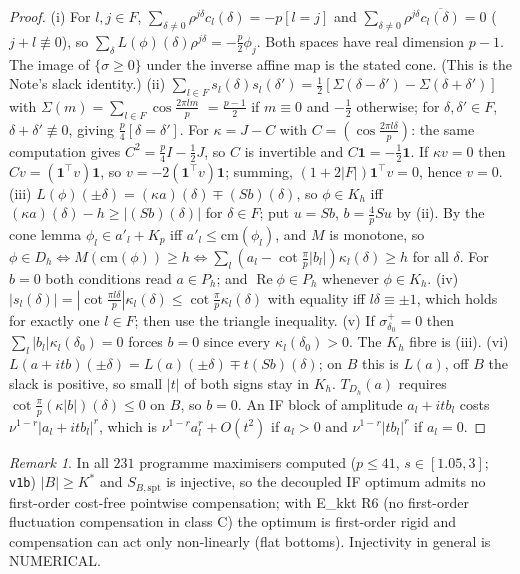 \documentclass[11pt]{article}
\theoremstyle{remark}
\newtheorem{remark}[theorem]{Remark}
\newcommand{\Re}{\operatorname{Re}}
\renewcommand{\Re}{\operatorname{Re}}
\begin{document}
\begin{proof}
(i) For $l,j\in F$, $\sum_{\delta\ne0}\rho^{j\delta}c_l(\delta)=-p[l=j]$ and $\sum_{\delta\ne0}\rho^{j\delta}\overline{c_l(\delta)}=0$
($j+l\not\equiv0$), so $\sum_\delta L(\phi)(\delta)\rho^{j\delta}=-\frac p2\phi_j$.  Both spaces have real dimension $p-1$.
The image of $\{\sigma\ge0\}$ under the inverse affine map is the stated cone.  (This is the Note's slack identity.)
(ii) $\sum_{l\in F}s_l(\delta)s_l(\delta')=\frac12[\Sigma(\delta-\delta')-\Sigma(\delta+\delta')]$ with $\Sigma(m)=\sum_{l\in F}\cos\frac{2\pi lm}p$
$=\frac{p-1}2$ if $m\equiv0$ and $-\frac12$ otherwise; for $\delta,\delta'\in F$, $\delta+\delta'\not\equiv0$, giving $\frac p4[\delta=\delta']$.
For $\kappa=J-C$ with $C=(\cos\frac{2\pi l\delta}p)$: the same computation gives $C^2=\frac p4I-\frac12J$, so $C$ is invertible and
$C\mathbf 1=-\frac12\mathbf 1$.  If $\kappa v=0$ then $Cv=(\mathbf 1^\top v)\mathbf 1$, so $v=-2(\mathbf 1^\top v)\mathbf 1$; summing,
$(1+2|F|)\mathbf 1^\top v=0$, hence $v=0$.
(iii) $L(\phi)(\pm\delta)=(\kappa a)(\delta)\mp(Sb)(\delta)$, so $\phi\in K_h$ iff $(\kappa a)(\delta)-h\ge|(Sb)(\delta)|$ for $\delta\in F$; put $u=Sb$,
$b=\frac4pSu$ by (ii).  By the cone lemma $\phi_l\in a'_l+K_p$ iff $a'_l\le\mathrm{cm}(\phi_l)$, and $M$ is monotone, so
$\phi\in D_h\iff M(\mathrm{cm}(\phi))\ge h\iff\sum_l(a_l-\cot\frac\pi p|b_l|)\kappa_l(\delta)\ge h$ for all $\delta$.  For $b=0$ both
conditions read $a\in P_h$; and $\Re\phi\in P_h$ whenever $\phi\in K_h$.
(iv) $|s_l(\delta)|=|\cot\frac{\pi l\delta}p|\kappa_l(\delta)\le\cot\frac\pi p\kappa_l(\delta)$ with equality iff $l\delta\equiv\pm1$, which holds for
exactly one $l\in F$; then use the triangle inequality.
(v) If $\sigma^+_{\delta_0}=0$ then $\sum_l|b_l|\kappa_l(\delta_0)=0$ forces $b=0$ since every $\kappa_l(\delta_0)>0$.  The $K_h$ fibre is (iii).
(vi) $L(a+itb)(\pm\delta)=L(a)(\pm\delta)\mp t(Sb)(\delta)$; on $B$ this is $L(a)$, off $B$ the slack is positive, so small $|t|$ of both
signs stay in $K_h$.  $T_{D_h}(a)$ requires $\cot\frac\pi p(\kappa|b|)(\delta)\le0$ on $B$, so $b=0$.  An IF block of amplitude
$a_l+itb_l$ costs $\nu^{1-r}|a_l+itb_l|^r$, which is $\nu^{1-r}a_l^r+O(t^2)$ if $a_l>0$ and $\nu^{1-r}|tb_l|^r$ if $a_l=0$.
\end{proof}

\begin{remark}
In all $231$ programme maximisers computed ($p\le41$, $s\in[1.05,3]$; \texttt{v1b}) $|B|\ge K^*$ and $S_{B,\mathrm{spt}}$ is injective, so the
decoupled IF optimum admits no first-order cost-free pointwise compensation; with E\_kkt R6 (no first-order fluctuation
compensation in class C) the optimum is first-order rigid and compensation can act only non-linearly (flat bottoms).
Injectivity in general is NUMERICAL.
\end{remark}
\end{document}
